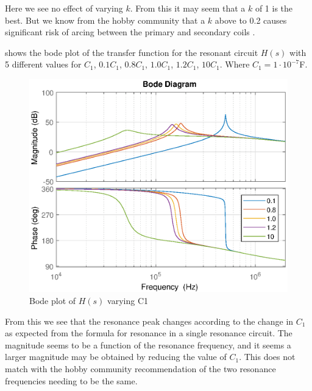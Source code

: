 Here we see no effect of varying $k$. From this it may seem that a $k$ of 1 is the best. But we know from the hobby community that a $k$ above to 0.2 causes significant risk of arcing between the primary and secondary coils \citep{scantesla} \citep{loneoceans} \citep{conner} \citep{easternvoltage} \citep{terrel} \citep{chunkyboy86}.

\newpage
{} shows the bode plot of the transfer function for the resonant circuit $H(s)$ with 5 different values for $C_1$, $0.1C_1$, $0.8C_1$, $1.0C_1$, $1.2C_1$, $10C_1$. Where $C_1 = 1 \cdot 10^{-7}$F.

\begin{figure}[H]
    \centering
    \includegraphics[width=\textwidth]{img/CoilRigBode_C1.eps}
    \caption{Bode plot of $H(s)$ varying C1}
    \label{fig:bode_c1}
\end{figure}

From this we see that the resonance peak changes according to the change in $C_1$ as expected from the formula for resonance in a single resonance circuit. The magnitude seems to be a function of the resonance frequency, and it seems a larger magnitude may be obtained by reducing the value of $C_1$. This does not match with the hobby community recommendation of the two resonance frequencies needing to be the same.


